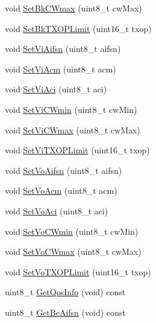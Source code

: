 \begin{DoxyCompactItemize}
void \hyperlink{classns3_1_1EdcaParameterSet_a296e36addc2a96fcb2dbb1ba4fa2d60d}{Set\+Bk\+C\+Wmax} (uint8\+\_\+t cw\+Max)
\item 
void \hyperlink{classns3_1_1EdcaParameterSet_a8af17e8c716d7c802fc277f31f6fd6d1}{Set\+Bk\+T\+X\+O\+P\+Limit} (uint16\+\_\+t txop)
\item 
void \hyperlink{classns3_1_1EdcaParameterSet_a0a67b8bc06cb145d62fa64583b7b0bd4}{Set\+Vi\+Aifsn} (uint8\+\_\+t aifsn)
\item 
void \hyperlink{classns3_1_1EdcaParameterSet_af97ea60d0b67049899fb899566f9e937}{Set\+Vi\+Acm} (uint8\+\_\+t acm)
\item 
void \hyperlink{classns3_1_1EdcaParameterSet_a9901129ea94b94d025e8bd192370a549}{Set\+Vi\+Aci} (uint8\+\_\+t aci)
\item 
void \hyperlink{classns3_1_1EdcaParameterSet_a951e9e886bf2ff53c69d6967f04f6b77}{Set\+Vi\+C\+Wmin} (uint8\+\_\+t cw\+Min)
\item 
void \hyperlink{classns3_1_1EdcaParameterSet_aa3dd779db09601b3608fb2cc59af9173}{Set\+Vi\+C\+Wmax} (uint8\+\_\+t cw\+Max)
\item 
void \hyperlink{classns3_1_1EdcaParameterSet_acb6507abd95f7835e315a7e6a3942e12}{Set\+Vi\+T\+X\+O\+P\+Limit} (uint16\+\_\+t txop)
\item 
void \hyperlink{classns3_1_1EdcaParameterSet_a77c6971bc91436da9ddbb3c31d01edcd}{Set\+Vo\+Aifsn} (uint8\+\_\+t aifsn)
\item 
void \hyperlink{classns3_1_1EdcaParameterSet_a4000533c01422056907a460342cc86bd}{Set\+Vo\+Acm} (uint8\+\_\+t acm)
\item 
void \hyperlink{classns3_1_1EdcaParameterSet_a2797a92b612133f44d4ed7fcd5d1e1e3}{Set\+Vo\+Aci} (uint8\+\_\+t aci)
\item 
void \hyperlink{classns3_1_1EdcaParameterSet_ae97a7f1d3f42e7018eea2ef6265445dd}{Set\+Vo\+C\+Wmin} (uint8\+\_\+t cw\+Min)
\item 
void \hyperlink{classns3_1_1EdcaParameterSet_aa4819199f4a3e388cda4db3aec2e45f1}{Set\+Vo\+C\+Wmax} (uint8\+\_\+t cw\+Max)
\item 
void \hyperlink{classns3_1_1EdcaParameterSet_a4d663aa0687af06b40da875238c6ebb5}{Set\+Vo\+T\+X\+O\+P\+Limit} (uint16\+\_\+t txop)
\item 
uint8\+\_\+t \hyperlink{classns3_1_1EdcaParameterSet_ad6b460dcf38b5fb6b1d0d492f2cc97fc}{Get\+Qos\+Info} (void) const 
\item 
uint8\+\_\+t \hyperlink{classns3_1_1EdcaParameterSet_a88019327c8e69381c3b0acbb54837f3c}{Get\+Be\+Aifsn} (void) const 

\end{DoxyCompactItemize}
